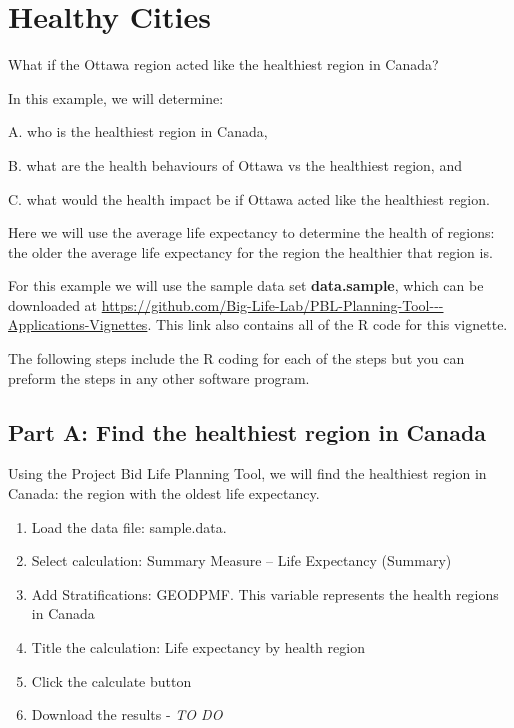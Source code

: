 \documentclass[]{book}
\begin{document}
\section{Healthy Cities}\label{healthy-cities}

What if the Ottawa region acted like the healthiest region in Canada?

In this example, we will determine:

A. who is the healthiest region in Canada,

B. what are the health behaviours of Ottawa vs the healthiest region,
and

C. what would the health impact be if Ottawa acted like the healthiest
region.

Here we will use the average life expectancy to determine the health of
regions: the older the average life expectancy for the region the
healthier that region is.

For this example we will use the sample data set \textbf{data.sample},
which can be downloaded at
\url{https://github.com/Big-Life-Lab/PBL-Planning-Tool---Applications-Vignettes}.
This link also contains all of the R code for this vignette.

The following steps include the R coding for each of the steps but you
can preform the steps in any other software program.

\subsection{Part A: Find the healthiest region in
Canada}\label{part-a-find-the-healthiest-region-in-canada}

Using the Project Bid Life Planning Tool, we will find the healthiest
region in Canada: the region with the oldest life expectancy.

\begin{enumerate}
\def\labelenumi{\arabic{enumi}.}
\item
  Load the data file: sample.data.
\item
  Select calculation: Summary Measure -- Life Expectancy (Summary)
\item
  Add Stratifications: GEODPMF. This variable represents the health
  regions in Canada
\item
  Title the calculation: Life expectancy by health region
\item
  Click the calculate button
\item
  Download the results - \emph{TO DO}
\end{enumerate}
\end{document}
